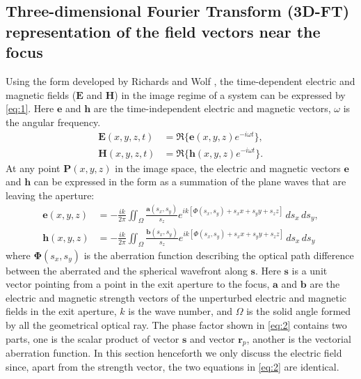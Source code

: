 \documentclass[9pt,twocolumn,twoside]{osajnl}
\begin{document}
\subsection{Three-dimensional Fourier Transform (3D-FT) representation of the field vectors near the focus}
Using the form developed by Richards and Wolf \cite{richards1959electromagnetic}, the time-dependent electric and magnetic fields ($\mathbf{E}$ and $\mathbf{H}$) in the image regime of a system can be expressed by \eqref{eq:1}. Here $\mathbf{e}$ and $\mathbf{h}$ are the time-independent electric and magnetic vectors, $\omega$ is the angular frequency.
\begin{equation}\label{eq:1}
	\begin{aligned}
		\mathbf{E}(x, y, z, t)&=\Re\{\mathbf{e}(x, y, z)e^{-i\omega t}\},\\
		\mathbf{H}(x, y, z, t)&=\Re\{\mathbf{h}(x, y, z)e^{-i\omega t}\}.
	\end{aligned}	
\end{equation}
At any point $\textbf{P}(x,y,z)$ in the image space, the electric and magnetic vectors $\mathbf{e}$ and $\mathbf{h}$ can be expressed in the form as a summation of the plane waves that are leaving the aperture:
\begin{equation}
	\begin{aligned}\label{eq:2}
		\textbf{e}(x, y, z)&=-\frac{ik}{2\pi}\iint_\Omega\frac{\textbf{a}(s_x, s_y)}{s_z}e^{ik[\textbf{$\Phi$}(s_x, s_y)+s_xx+s_yy+s_zz]}\,ds_x\,ds_y,\\
		\textbf{h}(x, y, z)&=-\frac{ik}{2\pi}\iint_\Omega\frac{\textbf{b}(s_x, s_y)}{s_z}e^{ik[\textbf{$\Phi$}(s_x, s_y)+s_xx+s_yy+s_zz]}\,ds_x\,ds_y
	\end{aligned}
\end{equation}
where $\mathbf{\Phi}(s_x, s_y)$ is the aberration function describing the optical path difference between the aberrated and the spherical wavefront along $\mathbf{s}$. Here $\mathbf{s}$ is a unit vector pointing from a point in the exit aperture to the focus, $\mathbf{a}$ and $\mathbf{b}$ are the electric and magnetic strength vectors of the unperturbed electric and magnetic fields in the exit aperture, $k$ is the wave number, and $\Omega$ is the solid angle formed by all the geometrical optical ray. The phase factor shown in \eqref{eq:2} contains two parts, one is the scalar product of vector $\mathbf{s}$ and vector $\mathbf{r}_p$, another is the vectorial aberration function. In this section henceforth we only discuss the electric field since, apart from the strength vector, the two equations in \eqref{eq:2} are identical. 
\end{document}
